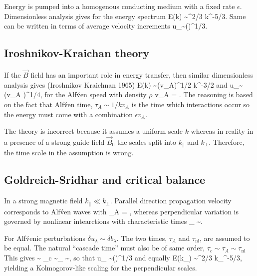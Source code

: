 \documentclass[usenatbib,twocolumn]{aastex63}
\begin{document}
Energy is pumped into a homogenous conducting medium with a fixed rate $\epsilon$.
Dimensionless analysis gives for the energy spectrum \citep{Kolmogorov_1941}
\be
E(k) \sim \epsilon^{2/3} k^{-5/3}.
\ee
Same can be written in terms of average velocity increments
\be
\delta u_\lambda \sim (\epsilon \lambda)^{1/3}.
\ee

\subsection{Iroshnikov-Kraichan theory}\label{sect:K65}

If the $\vec{B}$ field has an important role in energy transfer, then similar dimensionless analysis gives (Iroshnikov Kraichnan 1965)
\be
E(k) \sim (\epsilon v_A)^{1/2} k^{-3/2}
\ee
and
\be
\delta u_\lambda \sim (\epsilon v_A \lambda)^{1/4},
\ee
for the Alf\'ven speed with density $\rho$
\be
v_A = .
\ee
The reasoning is based on the fact that Alf\'ven time, $\tau_A \sim 1/k v_A$ is the time which interactions occur so the energy must come with a combination $\epsilon v_A$.

The theory is incorrect because it assumes a uniform scale $k$ whereas in reality in a presence of a strong guide field $\vec{B}_0$ the scales split into $k_{\parallel}$ and $k_{\perp}$.
Therefore, the time scale in the assumption is wrong.


\subsection{Goldreich-Sridhar and critical balance}\label{sect:GS95}

In a strong magnetic field $k_{\parallel} \ll k_{\perp}$.
Parallel direction propagation velocity corresponds to Alf\'ven waves with 
\be
\tau_A = ,
\ee
whereas perpendicular variation is governed by nonlinear intearctions with characteristic times
\be
\tau_{} \sim {}.
\ee

For Alf\'venic perturbations $\delta u_{\lambda} \sim \delta b_{\lambda}$.
The two times, $\tau_A$ and $\tau_{\mathrm{nl}}$, are assumed to be equal.
The natural ``cascade time'' must also be of same order, $\tau_c \sim \tau_A \sim \tau_{\mathrm{nl}}$
This gives 
\be
{} \sim \epsilon \quad{}\quad
\tau_c \sim \tau_{} \sim {},
\ee
so that
\be
\delta u_{\lambda} \sim (\epsilon \lambda)^{1/3}
\ee
and equally \citep{Goldreich_1995, 1997}
\be
E(k_\perp) \sim \epsilon^{2/3} k_{\perp}^{-5/3},
\ee
yielding a Kolmogorov-like scaling for the perpendicular scales.
\end{document}
